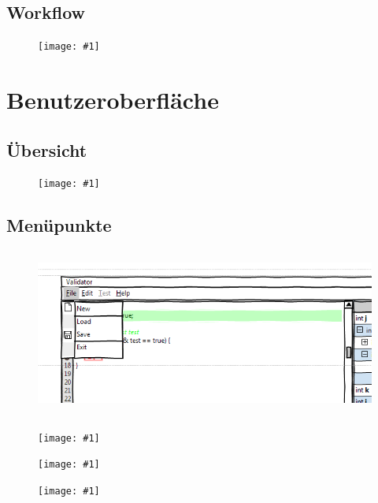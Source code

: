 \documentclass[a4paper,10pt]{article}
\newlength{\imgwidth}
\newcommand\scalegraphics[1]{
  \settowidth{\imgwidth}{\texttt{[image: \#1]}}
  \setlength{\imgwidth}{\minof{\imgwidth}{\textwidth}}
  \texttt{[image: \#1]}
}
\begin{document}
\newpage
\subsection{Workflow}
\begin{figure}[h!]
\begin{center}
\scalegraphics{images/process.png}
\end{center}
\end{figure}


\section{Benutzeroberfl\"{a}che}
\subsection{\"{U}bersicht}
\begin{figure}[h!]
\scalegraphics{images/mockupf.png}
\end{figure}

\subsection{Men\"{u}punkte}
\begin{figure}[h!]
\begin{center}
\includegraphics[height=5.5cm]{images/menu1.png}
\end{center}
\end{figure}
\begin{figure}[h!]
\begin{center}
\scalegraphics{images/menu2.png}
\end{center}
\end{figure}
\begin{figure}[h!]
\begin{center}
\scalegraphics{images/menu3.png}
\end{center}
\end{figure}
\begin{figure}[h!]
\begin{center}
\scalegraphics{images/menu4.png}
\end{center}
\end{figure}
\clearpage
\end{document}
